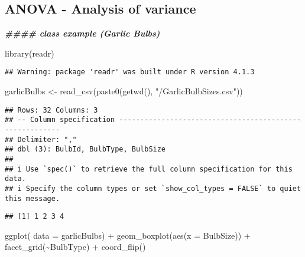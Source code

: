 \documentclass[
]{article}
\newenvironment{Shaded}{\begin{snugshade}}{\end{snugshade}}
\newcommand{\AttributeTok}[1]{\textcolor[rgb]{0.77,0.63,0.00}{#1}}
\newcommand{\DocumentationTok}[1]{\textcolor[rgb]{0.56,0.35,0.01}{\textbf{\textit{#1}}}}
\newcommand{\FunctionTok}[1]{\textcolor[rgb]{0.00,0.00,0.00}{#1}}
\newcommand{\NormalTok}[1]{#1}
\newcommand{\OtherTok}[1]{\textcolor[rgb]{0.56,0.35,0.01}{#1}}
\newcommand{\SpecialCharTok}[1]{\textcolor[rgb]{0.00,0.00,0.00}{#1}}
\newcommand{\StringTok}[1]{\textcolor[rgb]{0.31,0.60,0.02}{#1}}
\begin{document}
\hypertarget{anova---analysis-of-variance}{%
\subsection{ANOVA - Analysis of
variance}\label{anova---analysis-of-variance}}

\begin{Shaded}
\begin{Highlighting}[]
\DocumentationTok{\#\#\#\# class example (Garlic Bulbs)}

\FunctionTok{library}\NormalTok{(readr)}
\end{Highlighting}
\end{Shaded}

\begin{verbatim}
## Warning: package 'readr' was built under R version 4.1.3
\end{verbatim}

\begin{Shaded}
\begin{Highlighting}[]
\NormalTok{garlicBulbs }\OtherTok{\textless{}{-}} \FunctionTok{read\_csv}\NormalTok{(}\FunctionTok{paste0}\NormalTok{(}\FunctionTok{getwd}\NormalTok{(), }\StringTok{"/GarlicBulbSizes.csv"}\NormalTok{))}
\end{Highlighting}
\end{Shaded}

\begin{verbatim}
## Rows: 32 Columns: 3
## -- Column specification --------------------------------------------------------
## Delimiter: ","
## dbl (3): BulbId, BulbType, BulbSize
## 
## i Use `spec()` to retrieve the full column specification for this data.
## i Specify the column types or set `show_col_types = FALSE` to quiet this message.
\end{verbatim}

\begin{Shaded}
\end{Shaded}

\begin{verbatim}
## [1] 1 2 3 4
\end{verbatim}

\begin{Shaded}
\begin{Highlighting}[]
\FunctionTok{ggplot}\NormalTok{( }\AttributeTok{data =}\NormalTok{ garlicBulbs) }\SpecialCharTok{+}
  \FunctionTok{geom\_boxplot}\NormalTok{(}\FunctionTok{aes}\NormalTok{(}\AttributeTok{x =}\NormalTok{ BulbSize)) }\SpecialCharTok{+}
  \FunctionTok{facet\_grid}\NormalTok{(}\SpecialCharTok{\textasciitilde{}}\NormalTok{BulbType) }\SpecialCharTok{+}
  \FunctionTok{coord\_flip}\NormalTok{()}
\end{Highlighting}
\end{Shaded}
\end{document}
